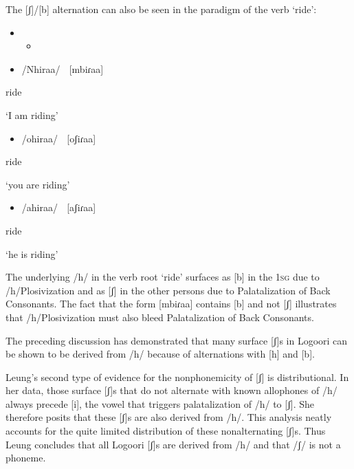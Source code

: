 \documentclass[output=paper]{langsci/langscibook}
\begin{document}
The [ʃ]/[b] alternation can also be seen in the paradigm of the verb ‘ride’:

\begin{itemize}
\item \setcounter{itemize}{0}
\begin{itemize}
\item \end{itemize}
\end{itemize}
\setcounter{itemize}{0}
\begin{itemize}
\item /Nhiraa/    [mbiɾaa]

\end{itemize}

ride

‘I am riding’

\begin{itemize}
\item /ohiraa/    \textsc{[}oʃiɾaa]

\end{itemize}

ride\textsc{ }

‘you are riding’  

\begin{itemize}
\item /ahiraa/    [aʃiɾaa]  

\end{itemize}

ride

‘he is riding’

The underlying /h/ in the verb root ‘ride’ surfaces as [b] in the 1\textsc{sg} due to /h/Plosivization and as [ʃ] in the other persons due to Palatalization of Back Consonants. The fact that the form [mbiɾaa] contains [b] and not [ʃ] illustrates that /h/Plosivization must also bleed Palatalization of Back Consonants. 

The preceding discussion has demonstrated that many surface [ʃ]s in Logoori can be shown to be derived from /h/ because of alternations with [h] and [b]. 

Leung’s second type of evidence for the nonphonemicity of [ʃ] is distributional. In her data, those surface [ʃ]s that do not alternate with known allophones of /h/ always precede [i], the vowel that triggers palatalization of /h/ to [ʃ]. She therefore posits that these [ʃ]s are also derived from /h/. This analysis neatly accounts for the quite limited distribution of these nonalternating [ʃ]s. Thus Leung concludes that all Logoori [ʃ]s are derived from /h/ and that /ʃ/ is not a phoneme.
\end{document}
